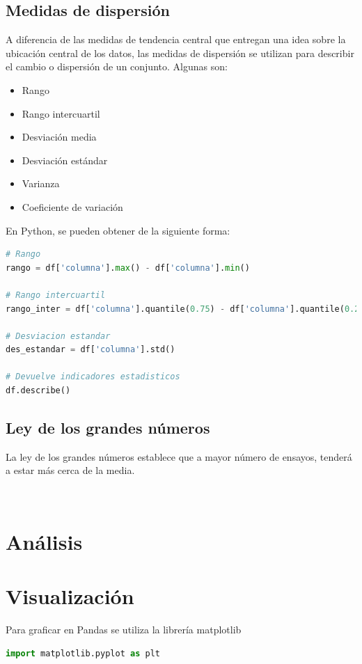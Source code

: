\documentclass[a4paper, 12pt]{book}
\begin{document}
\subsection{Medidas de dispersión}
A diferencia de las medidas de tendencia central que entregan una idea sobre la ubicación central de los datos, las medidas de dispersión se utilizan para describir el cambio o dispersión de un conjunto. Algunas son:
\begin{itemize}
	\item Rango
 	\item Rango intercuartil
 	\item Desviación media
 	\item Desviación estándar
 	\item Varianza
 	\item Coeficiente de variación
\end{itemize}
En Python, se pueden obtener de la siguiente forma:
\begin{lstlisting}[language=Python]
# Rango
rango = df['columna'].max() - df['columna'].min()
	
# Rango intercuartil
rango_inter = df['columna'].quantile(0.75) - df['columna'].quantile(0.25)

# Desviacion estandar
des_estandar = df['columna'].std()

# Devuelve indicadores estadisticos
df.describe()
\end{lstlisting}

\subsection{Ley de los grandes números}
La ley de los grandes números establece que a mayor número de ensayos, tenderá a estar más cerca de la media.

\begin{lstlisting}[language=Python]
	
\end{lstlisting}

\section{Análisis}

\section{Visualización}
Para graficar en Pandas se utiliza la librería matplotlib
\begin{lstlisting}[language=Python]
	import matplotlib.pyplot as plt
\end{lstlisting}
\end{document}

